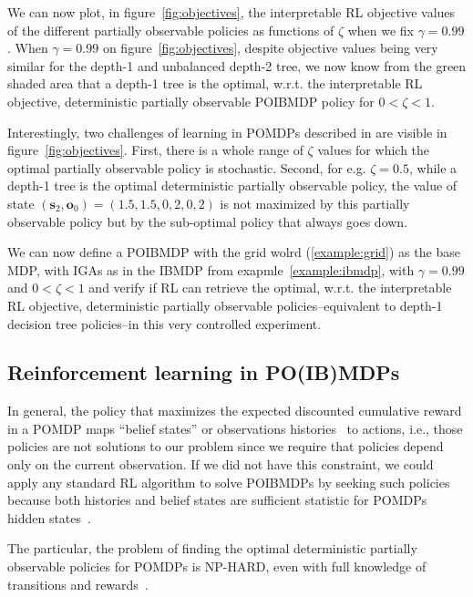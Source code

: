 We can now plot, in figure~\ref{fig:objectives}, the interpretable RL objective values of the different partially observable policies as functions of $\zeta$ when we fix $\gamma=0.99$. 
When $\gamma=0.99$ on figure~\ref{fig:objectives}, despite objective values being very similar for the depth-1 and unbalanced depth-2 tree, we now know from the green shaded area that a depth-1 tree is the optimal, w.r.t. the interpretable RL objective, deterministic partially observable POIBMDP policy for $0< \zeta < 1$.

Interestingly, two challenges of learning in POMDPs described in \cite{learning-pomdp} are visible in figure~\ref{fig:objectives}. 
First, there is a whole range of $\zeta$ values for which the optimal partially observable policy is stochastic.
Second, for e.g. $\zeta=0.5$, while a depth-1 tree is the optimal deterministic partially observable policy, the value of state $(\boldsymbol{s}_2, \boldsymbol{o}_0) = (1.5, 1.5, 0, 2, 0, 2)$ is not maximized by this partially observable policy but by the sub-optimal policy that always goes down.

We can now define a POIBMDP with the grid wolrd (\ref{example:grid}) as the base MDP, with IGAs as in the IBMDP from exapmle~\ref{example:ibmdp}, with $\gamma=0.99$ and $0<\zeta<1$ and verify if RL can retrieve the optimal, w.r.t. the interpretable RL objective, deterministic partially observable policies--equivalent to depth-1 decision tree policies--in this very controlled experiment.

\subsection{Reinforcement learning in PO(IB)MDPs}

In general, the policy that maximizes the expected discounted cumulative reward in a POMDP maps ``belief states'' or observations histories~\cite{chap2} to actions, i.e., those policies are not solutions to our problem since we require that policies depend only on the current observation.
If we did not have this constraint, we could apply any standard RL algorithm to solve POIBMDPs by seeking such policies because both histories and belief states are sufficient statistic for POMDPs hidden states~\cite{chap2,lambrechts2025informed}.

The particular, the problem of finding the optimal deterministic partially observable policies for POMDPs is NP-HARD, even with full knowledge of transitions and rewards~\cite[section 3.2]{littman1}. 


